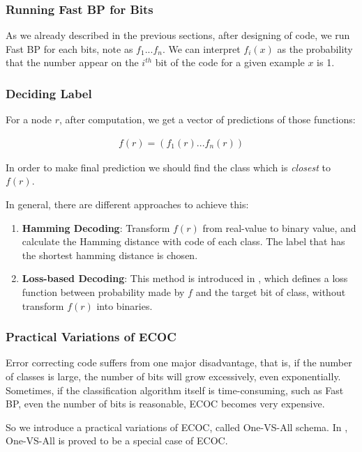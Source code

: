 \subsubsection*{Running Fast BP for Bits}

As we already described in the previous sections, after designing of code, we run Fast BP for each bits, note as $f_{1}...f_{n}$. We can interpret $f_{i}(x)$ as the probability that the number appear on the $i^{th}$ bit of the code for a given example $x$ is 1.

\subsubsection*{Deciding Label}

For a node $r$, after computation, we get a vector of predictions of those functions:

\begin{gather*}
	f(r) = (f_{1}(r)...f_{n}(r)) 
\end{gather*}


In order to make final prediction we should find the class which is \textit{closest} to $f(r)$.

In general, there are different approaches to achieve this:

\begin{enumerate}
	\item \textbf{Hamming Decoding}: Transform $f(r)$ from real-value to binary value, and calculate the Hamming distance with code of each class. The label that has the shortest hamming distance is chosen.
	\item \textbf{Loss-based Decoding}: This method is introduced in \cite{Erin2000}, which defines a loss function between probability made by $f$ and the target bit of class, without transform $f(r)$ into binaries.
\end{enumerate}

\subsubsection*{Practical Variations of ECOC}

Error correcting code suffers from one major disadvantage, that is, if the number of classes is large, the number of bits will grow excessively, even exponentially. Sometimes, if the classification algorithm itself is time-consuming, such as Fast BP, even the number of bits is reasonable, ECOC becomes very expensive. 

So we introduce a practical variations of ECOC, called One-VS-All schema. In \cite{Erin2000}, One-VS-All is proved to be a special case of ECOC. 

